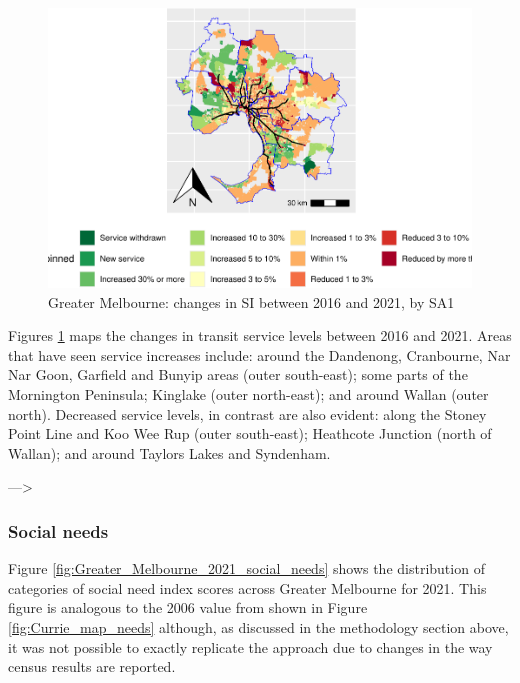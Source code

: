 \documentclass[preprint, 3p,
authoryear]{elsarticle} %
\begin{document}
\begin{figure}
\includegraphics[width=1\linewidth]{Leveraging_GTFS_to_assess_transit_supply_Transport_Geography_files/figure-latex/Greater_Melbourne_2016_2021_ratio_map-1} \caption{Greater Melbourne: changes in SI between 2016 and 2021, by SA1}\label{fig:Greater_Melbourne_2016_2021_ratio_map}
\end{figure}

Figures \ref{fig:Greater_Melbourne_2016_2021_ratio_map} maps the changes
in transit service levels between 2016 and 2021. Areas that have seen
service increases include: around the Dandenong, Cranbourne, Nar Nar
Goon, Garfield and Bunyip areas (outer south-east); some parts of the
Mornington Peninsula; Kinglake (outer north-east); and around Wallan
(outer north). Decreased service levels, in contrast are also evident:
along the Stoney Point Line and Koo Wee Rup (outer south-east);
Heathcote Junction (north of Wallan); and around Taylors Lakes and
Syndenham.

---\textgreater{}

\subsubsection{Social needs}\label{social-needs}

Figure \ref{fig:Greater_Melbourne_2021_social_needs} shows the
distribution of categories of social need index scores across Greater
Melbourne for 2021. This figure is analogous to the 2006 value from
\citet{currie2010identifying} shown in Figure \ref{fig:Currie_map_needs}
although, as discussed in the methodology section above, it was not
possible to exactly replicate the \citet{currie2010identifying} approach
due to changes in the way census results are reported.
\end{document}
